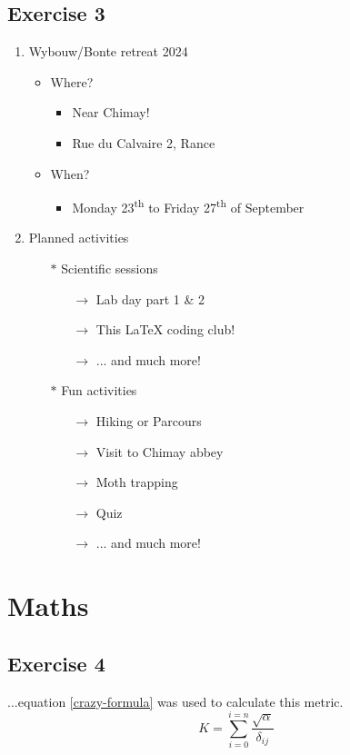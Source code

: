\documentclass[a4paper,12pt]{article} %
\begin{document}
\subsection{Exercise 3}
\begin{enumerate}
	\item Wybouw/Bonte retreat 2024
	\begin{itemize}
		\item Where?
		\begin{itemize}
			\item Near Chimay!
			\item Rue du Calvaire 2, Rance
		\end{itemize}
		\item When?
		\begin{itemize}
			\item Monday 23\textsuperscript{th} to Friday 27\textsuperscript{th} of September
		\end{itemize}
	\end{itemize}
	\item Planned activities
	\begin{itemize}
		\item[$\ast$] Scientific sessions
		\begin{itemize}
			\item[$\rightarrow$] Lab day part 1 \& 2
			\item[$\rightarrow$] This \LaTeX{} coding club!
			\item[$\rightarrow$] ... and much more!
		\end{itemize}
		\item[$\ast$] Fun activities
		\begin{itemize}
			\item[$\rightarrow$] Hiking or Parcours
			\item[$\rightarrow$] Visit to Chimay abbey
			\item[$\rightarrow$] Moth trapping
			\item[$\rightarrow$] Quiz
			\item[$\rightarrow$] ... and much more!
		\end{itemize}
	\end{itemize}
\end{enumerate}

\section{Maths}
\subsection{Exercise 4}
...equation \ref{crazy-formula} was used to calculate this metric.
\begin{equation}\label{crazy-formula}
K = \sum_{i=0}^{i=n}\frac{\sqrt{\alpha}}{\delta_{ij}}
\end{equation}
\end{document}
